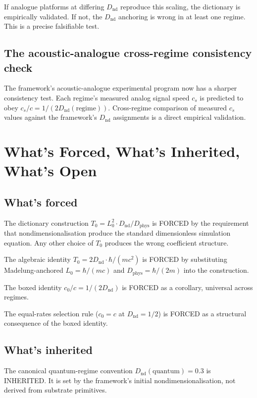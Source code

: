 \documentclass[11pt,a4paper]{article}
\begin{document}
If analogue platforms at differing $D_\mathrm{nd}$ reproduce this scaling, the dictionary is empirically validated. If not, the $D_\mathrm{nd}$ anchoring is wrong in at least one regime. This is a precise falsifiable test.

\subsection{The acoustic-analogue cross-regime consistency check}

The framework's acoustic-analogue experimental program now has a sharper consistency test. Each regime's measured analog signal speed $c_s$ is predicted to obey $c_s/c = 1/(2 D_\mathrm{nd}(\mathrm{regime}))$. Cross-regime comparison of measured $c_s$ values against the framework's $D_\mathrm{nd}$ assignments is a direct empirical validation.

\section{What's Forced, What's Inherited, What's Open}

\subsection{What's forced}

The dictionary construction $T_0 = L_0^{2} \cdot D_\mathrm{nd}/D_\mathrm{phys}$ is FORCED by the requirement that nondimensionalisation produce the standard dimensionless simulation equation. Any other choice of $T_0$ produces the wrong coefficient structure.

The algebraic identity $T_0 = 2 D_\mathrm{nd} \cdot \hbar/(mc^{2})$ is FORCED by substituting Madelung-anchored $L_0 = \hbar/(mc)$ and $D_\mathrm{phys} = \hbar/(2m)$ into the construction.

The boxed identity $c_0/c = 1/(2 D_\mathrm{nd})$ is FORCED as a corollary, universal across regimes.

The equal-rates selection rule ($c_0 = c$ at $D_\mathrm{nd} = 1/2$) is FORCED as a structural consequence of the boxed identity.

\subsection{What's inherited}

The canonical quantum-regime convention $D_\mathrm{nd}(\mathrm{quantum}) = 0.3$ is INHERITED. It is set by the framework's initial nondimensionalisation, not derived from substrate primitives.
\end{document}
